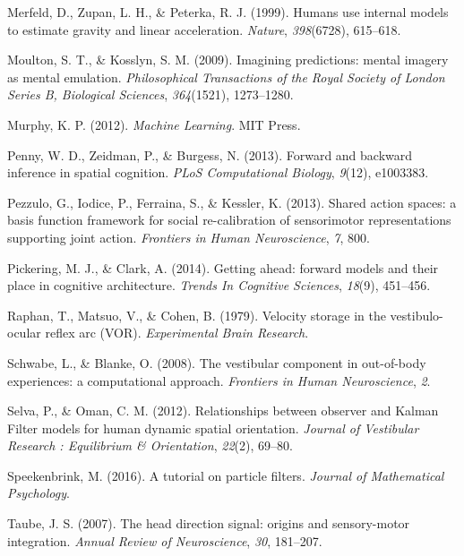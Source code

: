 \documentclass[english,floatsintext,man]{apa6}
\theoremstyle{definition}
\theoremstyle{definition}
\theoremstyle{remark}
\begin{document}
\hypertarget{ref-Merfeld:1999cg}{}
Merfeld, D., Zupan, L. H., \& Peterka, R. J. (1999). Humans use internal
models to estimate gravity and linear acceleration. \emph{Nature},
\emph{398}(6728), 615--618.

\hypertarget{ref-Moulton:2009ij}{}
Moulton, S. T., \& Kosslyn, S. M. (2009). Imagining predictions: mental
imagery as mental emulation. \emph{Philosophical Transactions of the
Royal Society of London Series B, Biological Sciences},
\emph{364}(1521), 1273--1280.

\hypertarget{ref-Murphy:2012ua}{}
Murphy, K. P. (2012). \emph{Machine Learning}. MIT Press.

\hypertarget{ref-Penny:2013iv}{}
Penny, W. D., Zeidman, P., \& Burgess, N. (2013). Forward and backward
inference in spatial cognition. \emph{PLoS Computational Biology},
\emph{9}(12), e1003383.

\hypertarget{ref-Pezzulo:2013iy}{}
Pezzulo, G., Iodice, P., Ferraina, S., \& Kessler, K. (2013). Shared
action spaces: a basis function framework for social re-calibration of
sensorimotor representations supporting joint action. \emph{Frontiers in
Human Neuroscience}, \emph{7}, 800.

\hypertarget{ref-Pickering:2014bo}{}
Pickering, M. J., \& Clark, A. (2014). Getting ahead: forward models and
their place in cognitive architecture. \emph{Trends In Cognitive
Sciences}, \emph{18}(9), 451--456.

\hypertarget{ref-Raphan:1979hn}{}
Raphan, T., Matsuo, V., \& Cohen, B. (1979). Velocity storage in the
vestibulo-ocular reflex arc (VOR). \emph{Experimental Brain Research}.

\hypertarget{ref-Schwabe:2008ho}{}
Schwabe, L., \& Blanke, O. (2008). The vestibular component in
out-of-body experiences: a computational approach. \emph{Frontiers in
Human Neuroscience}, \emph{2}.

\hypertarget{ref-Selva:2012gsa}{}
Selva, P., \& Oman, C. M. (2012). Relationships between observer and
Kalman Filter models for human dynamic spatial orientation.
\emph{Journal of Vestibular Research : Equilibrium \& Orientation},
\emph{22}(2), 69--80.

\hypertarget{ref-Speekenbrink:2016kc}{}
Speekenbrink, M. (2016). A tutorial on particle filters. \emph{Journal
of Mathematical Psychology}.

\hypertarget{ref-Taube:2007fk}{}
Taube, J. S. (2007). The head direction signal: origins and
sensory-motor integration. \emph{Annual Review of Neuroscience},
\emph{30}, 181--207.
\end{document}
